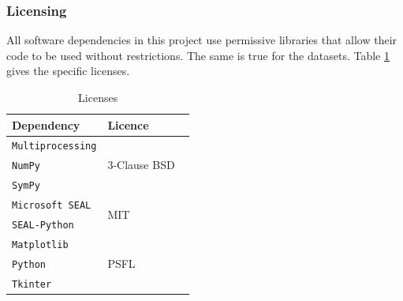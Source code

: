\subsubsection{Licensing}
\setlength{\leftskip}{0.5cm}
\indent \indent
All software dependencies in this project use permissive libraries that allow their code to be used without restrictions. The same is true for the datasets. Table \ref{tab:licensing} gives the specific licenses.
\begin{table}[H]
\centering
\def\arraystretch{1.25}
\begin{tabular}{|p{5cm}|p{4cm}|}
    \hline
    \textrm{\textbf{Dependency}} & \textrm{\textbf{Licence}} \\
    \hline \hline
    \texttt{Multiprocessing} & \multirow{3}{*}{\textrm{3-Clause BSD ~\cite{BSD}}} \\ 
    \texttt{NumPy} & \\ 
    \texttt{SymPy} & \\
    \hline
    \texttt{Microsoft SEAL} & \multirow{2}{*}{\textrm{MIT ~\cite{MIT}}} \\
    \texttt{SEAL-Python} & \\
    \hline
    \texttt{Matplotlib} & \multirow{3}{*}{\textrm{PSFL ~\cite{PSFL}}} \\ 
    \texttt{Python} & \\
    \texttt{Tkinter} & \\
    \hline
\end{tabular}
\caption{Licenses}
\label{tab:licensing}
\end{table}

\setlength{\leftskip}{0cm}

